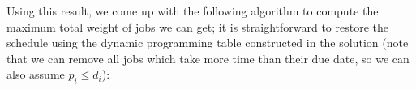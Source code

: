 \documentclass[a4paper]{article}
\begin{document}


Using this result, we come up with the following algorithm to compute the maximum total weight of jobs we can get; it is straightforward to restore the schedule using the dynamic programming
table constructed in the solution (note that we can remove all jobs which take more time than their due date, so we can also assume $p_i \le d_i$):
\end{document}
